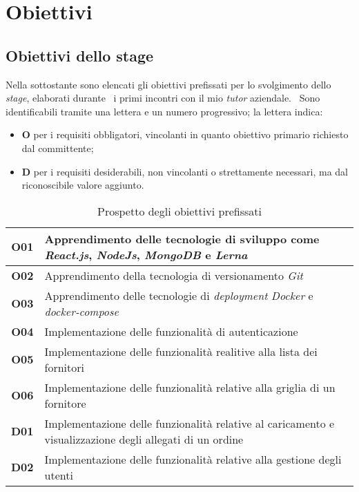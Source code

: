 \section{Obiettivi}

\subsection{Obiettivi dello stage}
Nella sottostante sono elencati gli obiettivi prefissati per lo svolgimento dello \emph{stage}, elaborati durante \
i primi incontri con il mio \emph{tutor} aziendale. \
Sono identificabili tramite una lettera e un numero progressivo; la lettera indica:
\begin{itemize}
  \item \textbf{O} per i requisiti obbligatori, vincolanti in quanto obiettivo primario richiesto dal committente;
  \item \textbf{D} per i requisiti desiderabili, non vincolanti o strettamente necessari, ma dal riconoscibile valore aggiunto.
\end{itemize}

\begin{center}
  \begin{table}[h]
    \begin{tabular}{ c | p{\textwidth - 40pt} }
      \textbf{O01} & Apprendimento delle tecnologie di sviluppo come \emph{React.js}, \emph{NodeJs}, \emph{MongoDB} e \emph{Lerna} \\ \hline
      \textbf{O02} & Apprendimento della tecnologia di versionamento \emph{Git} \\ \hline
      \textbf{O03} & Apprendimento delle tecnologie di \emph{deployment} \emph{Docker} e \emph{docker-compose} \\ \hline
      \textbf{O04} & Implementazione delle funzionalità di autenticazione \\ \hline
      \textbf{O05} & Implementazione delle funzionalità realitive alla lista dei fornitori \\ \hline
      \textbf{O06} & Implementazione delle funzionalità relative alla griglia di un fornitore \\ \hline
      \textbf{D01} & Implementazione delle funzionalità relative al caricamento e visualizzazione degli allegati di un ordine \\ \hline
      \textbf{D02} & Implementazione delle funzionalità relative alla gestione degli utenti \\
    \end{tabular}
    \caption{Prospetto degli obiettivi prefissati}
    \label{table:2.1}
  \end{table}
\end{center}

